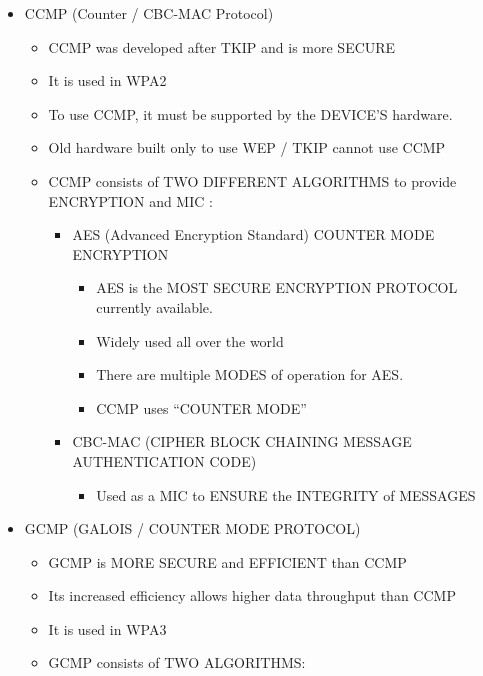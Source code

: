 \begin{itemize}
\tightlist
\item
  CCMP (Counter / CBC-MAC Protocol)

  \begin{itemize}
  \tightlist
  \item
    CCMP was developed after TKIP and is more SECURE
  \item
    It is used in WPA2
  \item
    To use CCMP, it must be supported by the DEVICE'S hardware.
  \item
    Old hardware built only to use WEP / TKIP cannot use CCMP
  \item
    CCMP consists of TWO DIFFERENT ALGORITHMS to provide ENCRYPTION and
    MIC :

    \begin{itemize}
    \tightlist
    \item
      AES (Advanced Encryption Standard) COUNTER MODE ENCRYPTION

      \begin{itemize}
      \tightlist
      \item
        AES is the MOST SECURE ENCRYPTION PROTOCOL currently available.
      \item
        Widely used all over the world
      \item
        There are multiple MODES of operation for AES.
      \item
        CCMP uses ``COUNTER MODE''
      \end{itemize}
    \item
      CBC-MAC (CIPHER BLOCK CHAINING MESSAGE AUTHENTICATION CODE)

      \begin{itemize}
      \tightlist
      \item
        Used as a MIC to ENSURE the INTEGRITY of MESSAGES
      \end{itemize}
    \end{itemize}
  \end{itemize}
\item
  GCMP (GALOIS / COUNTER MODE PROTOCOL)

  \begin{itemize}
  \tightlist
  \item
    GCMP is MORE SECURE and EFFICIENT than CCMP
  \item
    Its increased efficiency allows higher data throughput than CCMP
  \item
    It is used in WPA3
  \item
    GCMP consists of TWO ALGORITHMS:


\end{itemize}
\end{itemize}
